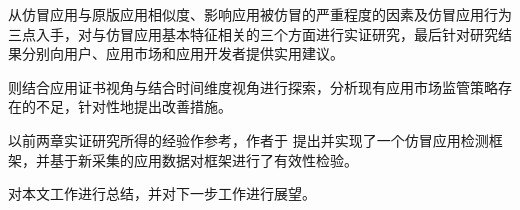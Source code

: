  从仿冒应用与原版应用相似度、影响应用被仿冒的严重程度的因素及仿冒应用行为三点入手，对与仿冒应用基本特征相关的三个方面进行实证研究，最后针对研究结果分别向用户、应用市场和应用开发者提供实用建议。

 则结合应用证书视角与结合时间维度视角进行探索，分析现有应用市场监管策略存在的不足，针对性地提出改善措施。

以前两章实证研究所得的经验作参考，作者于 提出并实现了一个仿冒应用检测框架，并基于新采集的应用数据对框架进行了有效性检验。



 对本文工作进行总结，并对下一步工作进行展望。
